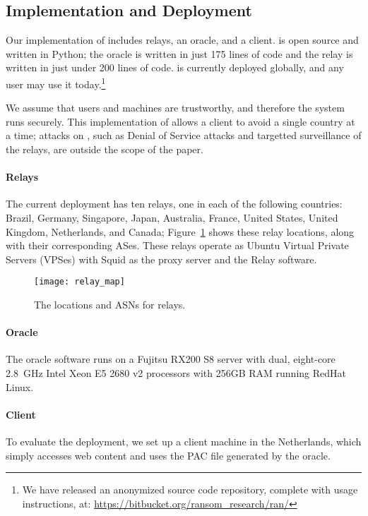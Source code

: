 \subsection{Implementation and Deployment}

Our implementation of \system{} includes relays, an oracle, and 
a client. \system{} is open source and written in Python; the oracle is written in just 
175 lines of code and the relay is written in just under 200 lines of code.  \system{} is currently deployed globally, and
any user may use it today.\footnote{We have released an anonymized source code repository,
complete with usage instructions, at: \url{https://bitbucket.org/ransom_research/ran/}}

We assume that users and machines are trustworthy, and therefore the system runs 
securely.  This implementation of \system{} allows a client to avoid a single country 
at a time; attacks on \system{}, such as Denial of Service attacks and targetted 
surveillance of the relays, are outside the scope of the paper.

\paragraph{Relays}  The current deployment has ten relays, one in each
of the following
countries: Brazil,  Germany, Singapore, Japan, Australia, France, United
States, United Kingdom, Netherlands, and Canada; Figure~\ref{fig:relay_locations}
shows these relay locations, along with their corresponding ASes. These relays operate
as Ubuntu Virtual Private Servers (VPSes) with Squid as the proxy
server and the \system{} Relay software.

\begin{figure}[t!]
\centering
\texttt{[image: relay\_map]}
\caption{The locations and ASNs for \system{} relays.}
\label{fig:relay_locations}
\end{figure}

\paragraph{Oracle}  The oracle software runs on a Fujitsu RX200 S8 server with dual, 
eight-core 2.8~GHz Intel Xeon E5 2680 v2 processors with 256GB RAM running 
RedHat Linux. 

\paragraph{Client} To evaluate the \system{} deployment, we set up a client 
machine in the Netherlands, which simply accesses web content and uses the PAC 
file generated by the oracle. 
